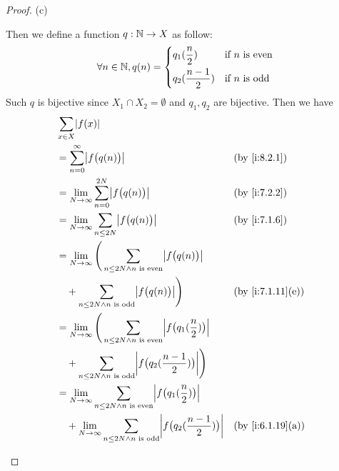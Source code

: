 \begin{proof}{(c)}
\begin{itemize}
          Then we define a function \(q : \mathbb{N} \to X\) as follow:
          \[
            \forall n \in \mathbb{N}, q(n) = \begin{dcases}
              q_1(\dfrac{n}{2})     & \text{if } n \text{ is even} \\
              q_2(\dfrac{n - 1}{2}) & \text{if } n \text{ is odd}
            \end{dcases}
          \]
          Such \(q\) is bijective since \(X_1 \cap X_2 = \emptyset\) and \(q_1, q_2\) are bijective.
          Then we have
          \begin{align*}
             & \sum_{x \in X} \abs{f(x)}                                                                                                                       \\
             & = \sum_{n = 0}^\infty \abs{f\big(q(n)\big)}                                                                               &  & \by{i:8.2.1}     \\
             & = \lim_{N \to \infty} \sum_{n = 0}^{2N} \abs{f\big(q(n)\big)}                                                             &  & \by{i:7.2.2}     \\
             & = \lim_{N \to \infty} \sum_{n \leq 2N} \abs{f\big(q(n)\big)}                                                              &  & \by{i:7.1.6}     \\
             & = \lim_{N \to \infty} \Bigg(\sum_{n \leq 2N \land n \text{ is even}} \abs{f\big(q(n)\big)}                                                      \\
             & \quad + \sum_{n \leq 2N \land n \text{ is odd}} \abs{f\big(q(n)\big)}\Bigg)                                               &  & \by{i:7.1.11}[e] \\
             & = \lim_{N \to \infty} \Bigg(\sum_{n \leq 2N \land n \text{ is even}} \abs{f\big(q_1(\dfrac{n}{2})\big)}                                         \\
             & \quad + \sum_{n \leq 2N \land n \text{ is odd}} \abs{f\big(q_2(\dfrac{n - 1}{2})\big)}\Bigg)                                                    \\
             & = \lim_{N \to \infty} \sum_{n \leq 2N \land n \text{ is even}} \abs{f\big(q_1(\dfrac{n}{2})\big)}                                               \\
             & \quad + \lim_{N \to \infty} \sum_{n \leq 2N \land n \text{ is odd}} \abs{f\big(q_2(\dfrac{n - 1}{2})\big)}                &  & \by{i:6.1.19}[a] \\

\end{align*}
\end{itemize}
\end{proof}
